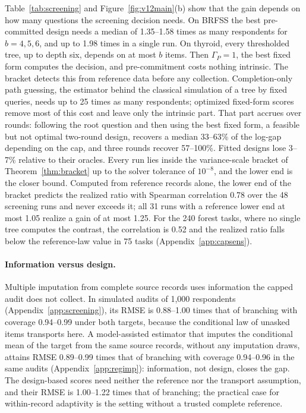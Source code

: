 Table~\ref{tab:screening} and Figure~\ref{fig:v12main}(b) show that the gain depends on how many questions the screening decision needs. On BRFSS the best pre-committed design needs a median of 1.35--1.58 times as many respondents for $b=4,5,6$, and up to 1.98 times in a single run. On thyroid, every thresholded tree, up to depth six, depends on at most $b$ items. Then $\Gamma_P=1$, the best fixed form computes the decision, and pre-commitment costs nothing intrinsic. The bracket detects this from reference data before any collection. Completion-only path guessing, the estimator behind the classical simulation of a tree by fixed queries, needs up to 25 times as many respondents; optimized fixed-form scores remove most of this cost and leave only the intrinsic part. That part accrues over rounds: following the root question and then using the best fixed form, a feasible but not optimal two-round design, recovers a median 33--63\% of the log-gap depending on the cap, and three rounds recover 57--100\%. Fitted designs lose 3--7\% relative to their oracles. Every run lies inside the variance-scale bracket of Theorem~\ref{thm:bracket} up to the solver tolerance of $10^{-8}$, and the lower end is the closer bound. Computed from reference records alone, the lower end of the bracket predicts the realized ratio with Spearman correlation 0.78 over the 48 screening runs and never exceeds it; all 31 runs with a reference lower end at most 1.05 realize a gain of at most 1.25. For the 240 forest tasks, where no single tree computes the contrast, the correlation is 0.52 and the realized ratio falls below the reference-law value in 75 tasks (Appendix~\ref{app:capsens}).

\paragraph{Information versus design.}
Multiple imputation from complete source records uses information the capped audit does not collect. In simulated audits of 1,000 respondents (Appendix~\ref{app:screening}), its RMSE is 0.88--1.00 times that of branching with coverage 0.94--0.99 under both targets, because the conditional law of unasked items transports here. A model-assisted estimator that imputes the conditional mean of the target from the same source records, without any imputation draws, attains RMSE 0.89--0.99 times that of branching with coverage 0.94--0.96 in the same audits (Appendix~\ref{app:regimp}): information, not design, closes the gap. The design-based scores need neither the reference nor the transport assumption, and their RMSE is 1.00--1.22 times that of branching; the practical case for within-record adaptivity is the setting without a trusted complete reference.

